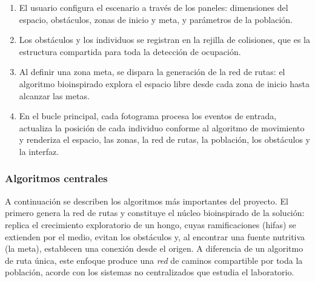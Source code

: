 \documentclass[12pt,a4paper]{article}
\begin{document}
\begin{enumerate}
    \item El usuario configura el escenario a través de los paneles: dimensiones del espacio, obstáculos, zonas de inicio y meta, y parámetros de la población.
    \item Los obstáculos y los individuos se registran en la rejilla de colisiones, que es la estructura compartida para toda la detección de ocupación.
    \item Al definir una zona meta, se dispara la generación de la red de rutas: el algoritmo bioinspirado explora el espacio libre desde cada zona de inicio hasta alcanzar las metas.
    \item En el bucle principal, cada fotograma procesa los eventos de entrada, actualiza la posición de cada individuo conforme al algoritmo de movimiento y renderiza el espacio, las zonas, la red de rutas, la población, los obstáculos y la interfaz.
\end{enumerate}

\subsubsection{Algoritmos centrales}

A continuación se describen los algoritmos más importantes del proyecto. El primero genera la red de rutas y constituye el núcleo bioinspirado de la solución: replica el crecimiento exploratorio de un hongo, cuyas ramificaciones (hifas) se extienden por el medio, evitan los obstáculos y, al encontrar una fuente nutritiva (la meta), establecen una conexión desde el origen. A diferencia de un algoritmo de ruta única, este enfoque produce una \emph{red} de caminos compartible por toda la población, acorde con los sistemas no centralizados que estudia el laboratorio.
\end{document}
